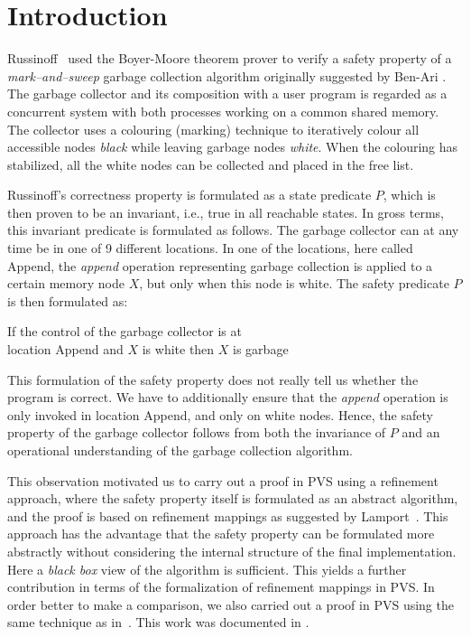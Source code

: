          
\section{Introduction}

Russinoff~\cite{Rus:GC} used   the Boyer-Moore theorem prover  to
verify  a  safety  property   of   a {\em  mark--and--sweep}   garbage
collection  algorithm originally suggested  by Ben-Ari \cite{Ben:GC}. 
The garbage collector and   its composition with   a user  program  is
regarded as a concurrent system with both processes working on
a common shared memory.  The  collector uses a colouring  (marking) technique
to iteratively colour all accessible nodes {\em black} while 
leaving garbage nodes {\em white}.  When the colouring has
stabilized, all the white nodes can be collected and placed in the
free list.

Russinoff's correctness property is formulated as a  state predicate $P$, which
is then proven to be an invariant, i.e., true in all reachable  states.
In gross  terms, 
this invariant predicate is formulated as  follows.  The garbage collector
can at 
any time be in one of 9 different locations.  In one of the locations,
here  called {\sc  Append},  the {\em append} operation  representing
garbage collection is applied to a certain  memory node $X$, but only
when this node is white. The safety  predicate  $P$  is  then formulated  as:

\begin{center}
  If the control of the garbage collector is at\\ location {\sc Append} and
  $X$ is white then $X$ is garbage 
\end{center}

\noindent
This formulation of   the  safety property does not really  tell us
whether the  program is correct.  We 
have to additionally ensure that  the {\em append} operation is
only invoked in location {\sc Append}, and only on white nodes.  Hence,
the safety property of the garbage collector follows from both the
invariance of $P$ and an operational understanding of the
garbage collection algorithm.  

This  observation motivated  us  to  carry  out a   proof  in PVS
\cite{Owre95:prolegomena} using   a  refinement approach,  where   the
safety property  itself  is formulated  as an  abstract algorithm, and
the proof  is  based  on refinement  mappings  as suggested  by
Lamport~\cite{TLA:TOPLAS94}.  This  approach   has the advantage  that  the
safety property can  be formulated more abstractly without considering
the internal structure of the final implementation.  Here a {\em black
  box} view   of the  algorithm is   sufficient.  This yields a
further contribution in terms of the 
formalization of refinement mappings in PVS.
In  order   better to make  a
comparison, we also carried out a proof in PVS using the same
technique   as  in~\cite{Rus:GC}.  This    work   was documented  in
\cite{havelund-pvs-gc-99}.

